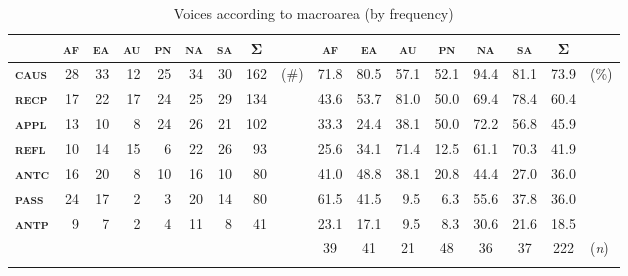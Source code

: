 \begin{table}
	\setlength{\tabcolsep}{2.7pt}
	\begin{tabularx}{\textwidth}{lrrrrrrrlrrrrrrrl}
		\lsptoprule
		& \multicolumn{1}{c}{\textbf{\textsc{af}}} & \multicolumn{1}{c}{\textbf{\textsc{ea}}} & \multicolumn{1}{c}{\textbf{\textsc{au}}} & \multicolumn{1}{c}{\textbf{\textsc{pn}}} & \multicolumn{1}{c}{\textbf{\textsc{na}}} & \multicolumn{1}{c}{\textbf{\textsc{sa}}} & \multicolumn{1}{c}{\textbf{Σ}} & & \multicolumn{1}{c}{\textbf{\textsc{af}}} & \multicolumn{1}{c}{\textbf{\textsc{ea}}} & \multicolumn{1}{c}{\textbf{\textsc{au}}} & \multicolumn{1}{c}{\textbf{\textsc{pn}}} & \multicolumn{1}{c}{\textbf{\textsc{na}}} & \multicolumn{1}{c}{\textbf{\textsc{sa}}} & \multicolumn{1}{c}{\textbf{Σ}} & \\
		\midrule
		\textbf{\textsc{caus}} & 28 & 33 & 12 & 25 & 34 & 30 & 162 & (\#) & 71.8 & 80.5 & 57.1 & 52.1 & 94.4 & 81.1 & 73.9 & (\%) \\
		\textbf{\textsc{recp}} & 17 & 22 & 17 & 24 & 25 & 29 & 134 & & 43.6 & 53.7 & 81.0 & 50.0 & 69.4 & 78.4 & 60.4 & \\
		\textbf{\textsc{appl}} & 13 & 10 & 8 & 24 & 26 & 21 & 102 & & 33.3 & 24.4 & 38.1 & 50.0 & 72.2 & 56.8 & 45.9 & \\
		\textbf{\textsc{refl}} & 10 & 14 & 15 & 6 & 22 & 26 & 93 & & 25.6 & 34.1 & 71.4 & 12.5 & 61.1 & 70.3 & 41.9 & \\
		\textbf{\textsc{antc}} & 16 & 20 & 8 & 10 & 16 & 10 & 80 & & 41.0 & 48.8 & 38.1 & 20.8 & 44.4 & 27.0 & 36.0 & \\
		\textbf{\textsc{pass}} & 24 & 17 & 2 & 3 & 20 & 14 & 80 & & 61.5 & 41.5 & 9.5 & 6.3 & 55.6 & 37.8 & 36.0 & \\
		\textbf{\textsc{antp}} & 9 & 7 & 2 & 4 & 11 & 8 & 41 & & 23.1 & 17.1 & 9.5 & 8.3 & 30.6 & 21.6 & 18.5 & \\
		\midrule
		& & & & & & & & & \multicolumn{1}{c}{39} & \multicolumn{1}{c}{41} & \multicolumn{1}{c}{21} & \multicolumn{1}{c}{48} & \multicolumn{1}{c}{36} & \multicolumn{1}{c}{37} & \multicolumn{1}{c}{222} & (\textit{n}) \\
		\lspbottomrule
	\end{tabularx}
	\caption{Voices according to macroarea (by frequency)}
	\label{tab:ch6:voice-frequency}
\end{table} 

